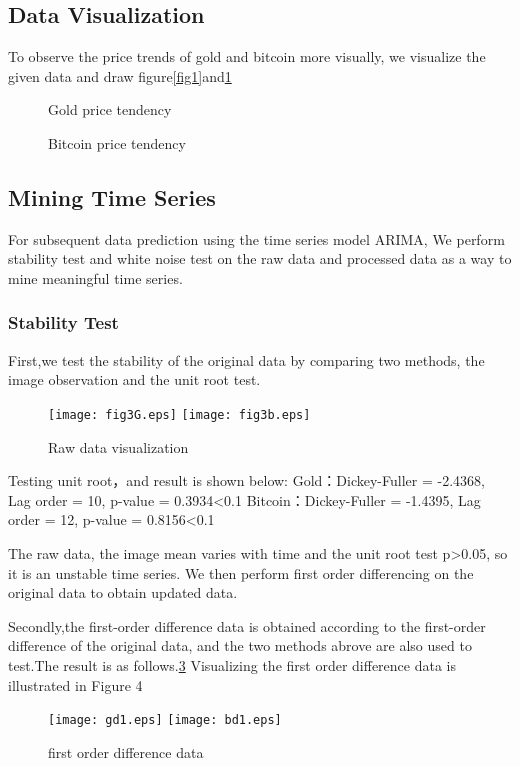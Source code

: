 \documentclass{mcmthesis}
\begin{document}
\subsection{Data Visualization}
To observe the price trends of gold and bitcoin more visually,
we visualize the given data and draw figure\ref{fig1}and\ref{fig2}
\begin{figure}[h]
  \centering
  \caption{Gold price tendency} \label{fig1}
  \centering
  \caption{Bitcoin price tendency} \label{fig2}
  \end{figure}


\subsection{Mining Time Series}
For subsequent data prediction using the time series model ARIMA,
We perform stability test and white noise test on the raw data and processed data as a way to mine meaningful time series.


\subsubsection{Stability Test}
First,we test the stability of the original data by comparing two methods, the image observation and the unit root test.
\begin{figure}[!hb]
  \centering 
  \texttt{[image: fig3G.eps]}
  \texttt{[image: fig3b.eps]}
  \caption{Raw data visualization} \label{fig3}
\end{figure}
Testing unit root，and result is shown below:
Gold：Dickey-Fuller = -2.4368, Lag order = 10, p-value = 0.3934<0.1
Bitcoin：Dickey-Fuller = -1.4395, Lag order = 12, p-value = 0.8156<0.1

The raw data, the image mean varies with time and the unit root test p>0.05, so it is an unstable time series.
We then perform first order differencing on the original data to obtain updated data.


Secondly,the first-order difference data is obtained according to the first-order difference of the original data, 
and the two methods abrove are also used to test.The result is as follows.\ref{fig4}
Visualizing the first order difference data is illustrated in Figure 4
\begin{figure}[!hb]
  \centering 
  \texttt{[image: gd1.eps]}
  \texttt{[image: bd1.eps]}
  \caption{first order difference data} \label{fig4}
\end{figure}
\end{document}
